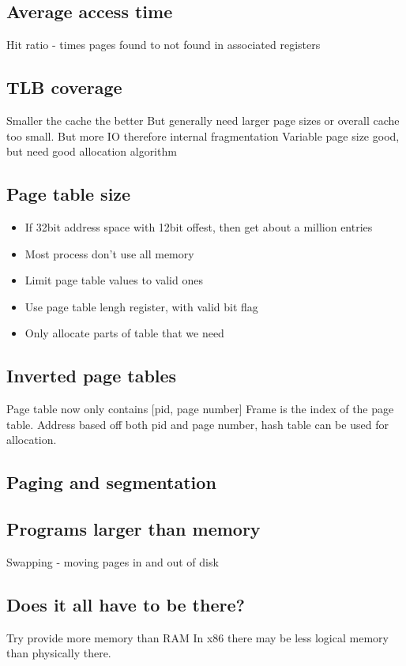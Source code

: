 \documentclass{article}
\begin{document}
	\subsection{Average access time}
		Hit ratio - times pages found to not found in associated registers

	\subsection{TLB coverage}
		Smaller the cache the better
		But generally need larger page sizes or overall cache too small. But more IO therefore internal fragmentation
		Variable page size good, but need good allocation algorithm

	\subsection{Page table size}
		\begin{itemize}
			\item If 32bit address space with 12bit offest, then get about a million entries
			\item Most process don't use all memory
			\item Limit page table values to valid ones
			\item Use page table lengh register, with valid bit flag
			\item Only allocate parts of table that we need
		\end{itemize}

	\subsection{Inverted page tables}
		Page table now only contains [pid, page number]
		Frame is the index of the page table.
		Address based off both pid and page number, hash table can be used for allocation.

	\subsection{Paging and segmentation}

	\subsection{Programs larger than memory}
		Swapping - moving pages in and out of disk

	\subsection{Does it all have to be there?}
		Try provide more memory than RAM
		In x86 there may be less logical memory than physically there.
\end{document}
